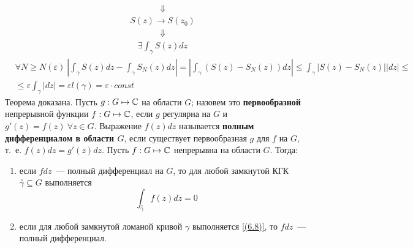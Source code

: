 \begin{align*}
  & \Downarrow
\end{align*}
\begin{align*}
  & S(z) \rightarrow S(z_0)
\end{align*}
\begin{align*}
  & \Downarrow
\end{align*}
\begin{align*}
  & \exists \int_{\gamma}S(z)dz
\end{align*}
\begin{align*}
  &\forall N \geq N(\varepsilon) \ \left| \int_{\gamma}S(z)dz - \int_{\gamma}S_N(z)dz\right| = \left| \int_\gamma \left( S(z) - S_N(z) \right)dz\right| \leq \int_\gamma \left| S(z) - S_N(z) \right| \left| dz \right| \leq \\
  & \leq \varepsilon \int_{\gamma} \left| dz \right| = \varepsilon l(\gamma) = \varepsilon \cdot const
\end{align*}
Теорема доказана.
\Def
Пусть $g: G \mapsto \mathbb{C}$ на области $G$; назовем это \textbf{первообразной}
непрерывной функции $f: G \mapsto \mathbb{C}$, если $g$ регулярна на $G$ и $g'(z) =
f(z) \ \forall z \in G$.
\Def
Выражение $f(z)dz$ называется \textbf{полным дифференциалом в области $G$}, если
существует первообразная $g$ для $f$ на $G$, т.~е. $f(z)dz = g'(z)dz$.
\theorem
Пусть $f:G \mapsto \mathbb{C}$ непрерывна на области $G$. Тогда:
\begin{enumerate}
    \item если $f dz$~--- полный дифференциал на $G$, то для любой замкнутой КГК
    $\overset{\circ}{\gamma} \subseteq G$ выполняется
    \begin{equation} \label{(6.9)}
        \int_{\overset{\circ}{\gamma}} f(z) dz = 0
    \end{equation}
    \item если для любой замкнутой ломаной кривой $\gamma$ выполняется
    \eqref{(6.8)}, то $f dz$~--- полный дифференциал.
\end{enumerate}
\pr ~
\\
